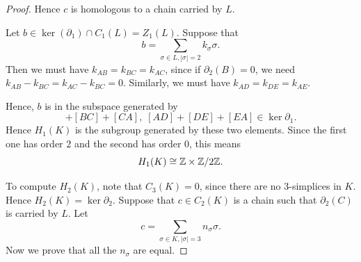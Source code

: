 \documentclass{unswmaths}
\begin{document}
\begin{proof}
Hence $c$ is homologous to a chain carried by $L$. 

Let $b \in \ker(\partial_1)\cap C_1(L) = Z_1(L)$. Suppose
that
\begin{equation*}
    b = \sum_{\sigma \in L,|\sigma| = 2} k_\sigma \sigma.
\end{equation*}
Then we must have $k_{AB} = k_{BC} = k_{AC}$, 
since if $\partial_2(B) = 0$, we 
need $k_{AB}-k_{BC} = k_{AC}-k_{BC} = 0$. 
Similarly, we must have $k_{AD} = k_{DE} = k_{AE}$.

Hence, $b$ is in the subspace generated
by
\begin{equation*}
    [AB]+[BC]+[CA],\;[AD]+[DE]+[EA] \in \ker\partial_1.
\end{equation*}
Hence $H_1(K)$ is the subgroup generated
by these two elements. Since the first one
has order $2$ and the second has order $0$, this means
\begin{equation*}
    H_1(K) \cong \mathbb{Z}\times \mathbb{Z}/2\mathbb{Z}.
\end{equation*}

To compute $H_2(K)$, note that $C_3(K) = 0$, since there are no $3$-simplices
in $K$. Hence $H_2(K) = \ker\partial_2$. Suppose that $c \in C_2(K)$ is a chain
such that $\partial_2(C)$ is carried by $L$. Let
\begin{equation*}
    c = \sum_{\sigma \in K,|\sigma| = 3} n_\sigma \sigma.
\end{equation*}
Now we prove that all the $n_\sigma$ are equal.


\end{proof}
\end{document}
